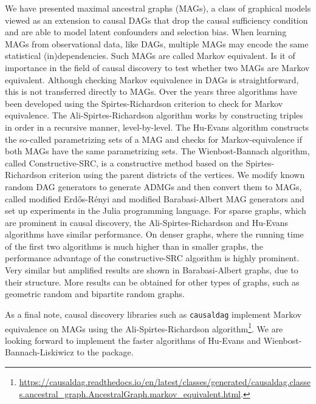 \documentclass[a4paper]{article}
\begin{document}
We have presented maximal ancestral graphs (MAGs), a class of graphical models viewed as an extension to causal DAGs that drop the causal sufficiency condition and are able to model latent confounders and selection bias. When learning MAGs from observational data, like DAGs, multiple MAGs may encode the same statistical (in)dependencies. Such MAGs are called Markov equivalent. Is it of importance in the field of causal discovery to test whether two MAGs are Markov equivalent. Although checking Markov equivalence in DAGs is  straightforward, this is not transferred directly to MAGs. Over the years three algorithms have been developed using the Spirtes-Richardson criterion to check for Markov equivalence. The Ali-Spirtes-Richardson algorithm works by constructing triples in order in a recursive manner, level-by-level. The Hu-Evans algorithm constructs the so-called parametrizing sets of a MAG and checks for Markov-equivalence if both MAGs have the same parametrizing sets. The Wienbost-Bannach algorithm, called Constructive-SRC, is a constructive method based on the Spirtes-Richardson criterion using the parent districts of the vertices. We modify known random DAG generators to generate ADMGs and then convert them to MAGs, called modified Erd\H{o}s-R\'{e}nyi and modified Barabasi-Albert MAG generators and set up experiments in the Julia programming language. For sparse graphs, which are prominent in causal discovery, the Ali-Spirtes-Richardson and Hu-Evans algorithms have similar performance. On denser graphs, where the running time of the first two algorithms is much higher than in smaller graphs, the performance advantage of the constructive-SRC algorithm is highly prominent. Very similar but amplified results are shown in Barabasi-Albert graphs, due to their structure. More results can be obtained for other types of graphs, such as geometric random and bipartite random graphs. 

As a final note, causal discovery libraries such as \texttt{causaldag} implement Markov equivalence on MAGs using the Ali-Spirtes-Richardson algorithm\footnote{\url{https://causaldag.readthedocs.io/en/latest/classes/generated/causaldag.classes.ancestral\_graph.AncestralGraph.markov\_equivalent.html}.}. We are looking forward to implement the faster algorithms of Hu-Evans and Wienbost-Bannach-Liskiwicz to the package.

\pagebreak
\end{document}
